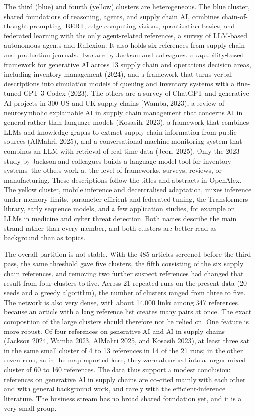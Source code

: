 The third (blue) and fourth (yellow) clusters are heterogeneous. The blue cluster, shared foundations of reasoning, agents, and supply chain AI, combines chain-of-thought prompting, BERT, edge computing visions, quantisation basics, and federated learning with the only agent-related references, a survey of LLM-based autonomous agents and Reflexion. It also holds six references from supply chain and production journals. Two are by Jackson and colleagues: a capability-based framework for generative AI across 13 supply chain and operations decision areas, including inventory management (2024), and a framework that turns verbal descriptions into simulation models of queuing and inventory systems with a fine-tuned GPT-3 Codex (2023). The others are a survey of ChatGPT and generative AI projects in 300 US and UK supply chains (Wamba, 2023), a review of neurosymbolic explainable AI in supply chain management that concerns AI in general rather than language models (Kosasih, 2023), a framework that combines LLMs and knowledge graphs to extract supply chain information from public sources (AlMahri, 2025), and a conversational machine-monitoring system that combines an LLM with retrieval of real-time data (Jeon, 2025). Only the 2023 study by Jackson and colleagues builds a language-model tool for inventory systems; the others work at the level of frameworks, surveys, reviews, or manufacturing. These descriptions follow the titles and abstracts in OpenAlex. The yellow cluster, mobile inference and decentralised adaptation, mixes inference under memory limits, parameter-efficient and federated tuning, the Transformers library, early sequence models, and a few application studies, for example on LLMs in medicine and cyber threat detection. Both names describe the main strand rather than every member, and both clusters are better read as background than as topics.



The overall partition is not stable. With the 485 articles screened before the third pass, the same threshold gave five clusters, the fifth consisting of the six supply chain references, and removing two further suspect references had changed that result from four clusters to five. Across 21 repeated runs on the present data (20 seeds and a greedy algorithm), the number of clusters ranged from three to five. The network is also very dense, with about 14{,}000 links among 347 references, because an article with a long reference list creates many pairs at once. The exact composition of the large clusters should therefore not be relied on. One feature is more robust. Of four references on generative AI and AI in supply chains (Jackson 2024, Wamba 2023, AlMahri 2025, and Kosasih 2023), at least three sat in the same small cluster of 4 to 13 references in 14 of the 21 runs; in the other seven runs, as in the map reported here, they were absorbed into a larger mixed cluster of 60 to 160 references. The data thus support a modest conclusion: references on generative AI in supply chains are co-cited mainly with each other and with general background work, and rarely with the efficient-inference literature. The business stream has no broad shared foundation yet, and it is a very small group.

